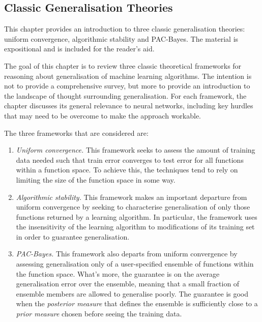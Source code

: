 \begin{refsection}

\chapter{Classic Generalisation Theories}
\label{chap:g-theory}

\begin{tcolorbox}
This chapter provides an introduction to three classic generalisation theories: uniform convergence, algorithmic stability and PAC-Bayes. The material is expositional and is included for the reader's aid.
\end{tcolorbox}

The goal of this chapter is to review three classic theoretical frameworks for reasoning about generalisation of machine learning algorithms. The intention is not to provide a comprehensive survey, but more to provide an introduction to the landscape of thought surrounding generalisation. For each framework, the chapter discusses its general relevance to neural networks, including key hurdles that may need to be overcome to make the approach workable.

The three frameworks that are considered are:
\begin{enumerate}
    \item \textit{Uniform convergence.} This framework seeks to assess the amount of training data needed such that train error converges to test error for all functions within a function space. To achieve this, the techniques tend to rely on limiting the size of the function space in some way.
    \item \textit{Algorithmic stability.} This framework makes an important departure from uniform convergence by seeking to characterise generalisation of only those functions returned by a learning algorithm. In particular, the framework uses the insensitivity of the learning algorithm to modifications of its training set in order to guarantee generalisation.
    \item \textit{PAC-Bayes.} This framework also departs from uniform convergence by assessing generalisation only of a user-specified ensemble of functions within the function space. What's more, the guarantee is on the average generalisation error over the ensemble, meaning that a small fraction of ensemble members are allowed to generalise poorly. The guarantee is good when the \textit{posterior measure} that defines the ensemble is sufficiently close to a \textit{prior measure} chosen before seeing the training data.
\end{enumerate}


\end{refsection}
